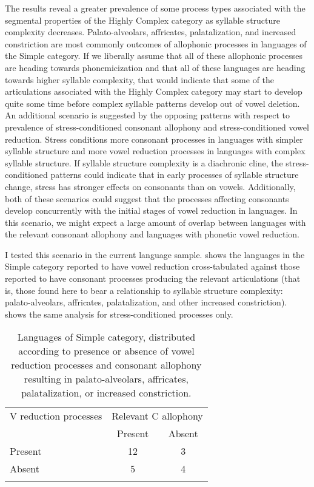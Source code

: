   The results reveal a greater prevalence of some process types associated with the segmental properties of the Highly Complex category as syllable structure complexity decreases. Palato-alveolars, affricates, palatalization, and increased constriction are most commonly outcomes of allophonic processes in languages of the Simple category. If we liberally assume that all of these allophonic processes are heading towards phonemicization and that all of these languages are heading towards higher syllable complexity, that would indicate that some of the articulations associated with the Highly Complex category may start to develop quite some time before complex syllable patterns develop out of vowel deletion. An additional scenario is suggested by the opposing patterns with respect to prevalence of stress-conditioned consonant allophony and stress-conditioned vowel reduction. Stress conditions more consonant processes in languages with simpler syllable structure and more vowel reduction processes in languages with complex syllable structure. If syllable structure complexity is a diachronic cline, the stress-conditioned patterns could indicate that in early processes of syllable structure change, stress has stronger effects on consonants than on vowels. Additionally, both of these scenarios could suggest that the processes affecting consonants develop concurrently with the initial stages of vowel reduction in languages. In this scenario, we might expect a large amount of overlap between languages with the relevant consonant allophony and languages with phonetic vowel reduction.

  I tested this scenario in the current language sample.  shows the languages in the Simple category reported to have vowel reduction cross-tabulated against those reported to have consonant processes producing the relevant articulations (that is, those found here to bear a relationship to syllable structure complexity: palato-alveolars, affricates, palatalization, and other increased constriction).  shows the same analysis for stress-conditioned processes only.

\begin{table}
\begin{tabular}{lcc}
\lsptoprule
 {V reduction processes} & \multicolumn{2}{c}{Relevant C allophony}\\\cmidrule(lr){2-3}
                 & {Present} & {Absent}\\\midrule
 {Present} & 12 & 3\\
 {Absent} & 5 & 4\\
\lspbottomrule
\end{tabular}
\caption{\label{tab:7.10}Languages of Simple category, distributed according to presence or absence of vowel reduction processes and consonant allophony resulting in palato-alveolars, affricates, palatalization, or increased constriction.}
\end{table}




